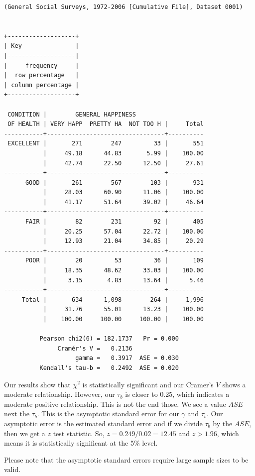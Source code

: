 \documentclass[
]{book}
\begin{document}
\begin{verbatim}
(General Social Surveys, 1972-2006 [Cumulative File], Dataset 0001)


+-------------------+
| Key               |
|-------------------|
|     frequency     |
|  row percentage   |
| column percentage |
+-------------------+

 CONDITION |        GENERAL HAPPINESS
 OF HEALTH | VERY HAPP  PRETTY HA  NOT TOO H |     Total
-----------+---------------------------------+----------
 EXCELLENT |       271        247         33 |       551 
           |     49.18      44.83       5.99 |    100.00 
           |     42.74      22.50      12.50 |     27.61 
-----------+---------------------------------+----------
      GOOD |       261        567        103 |       931 
           |     28.03      60.90      11.06 |    100.00 
           |     41.17      51.64      39.02 |     46.64 
-----------+---------------------------------+----------
      FAIR |        82        231         92 |       405 
           |     20.25      57.04      22.72 |    100.00 
           |     12.93      21.04      34.85 |     20.29 
-----------+---------------------------------+----------
      POOR |        20         53         36 |       109 
           |     18.35      48.62      33.03 |    100.00 
           |      3.15       4.83      13.64 |      5.46 
-----------+---------------------------------+----------
     Total |       634      1,098        264 |     1,996 
           |     31.76      55.01      13.23 |    100.00 
           |    100.00     100.00     100.00 |    100.00 

          Pearson chi2(6) = 182.1737   Pr = 0.000
               Cramér's V =   0.2136
                    gamma =   0.3917  ASE = 0.030
          Kendall's tau-b =   0.2492  ASE = 0.020
\end{verbatim}

Our results show that \(\chi^2\) is statistically significant and our Cramer's \(V\) shows a moderate relationship. However, our \(\tau_b\) is closer to 0.25, which indicates a moderate positive relationship. This is not the end those. We see a value \(ASE\) next the \(\tau_b\). This is the asymptotic standard error for our \(\gamma\) and \(\tau_b\). Our asymptotic error is the estimated standard error and if we divide \(\tau_b\) by the \(ASE\), then we get a \(z\) test statistic. So, \(z=0.249/0.02=12.45\) and \(z > 1.96\), which means it is statistically significant at the 5\% level.

Please note that the asymptotic standard errors require large sample sizes to be valid.
\end{document}
